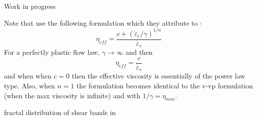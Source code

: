 {Work in progress}

\Literature \cite{zico74,zigo74,zico74b,zien75,corm75,zigo75,zihl75,zijo78,vidm82,vidm84,vede84,zivt85,vimd86}
\cite{wasd97,debo88,debo01,hesd02,bewv11,mumg10,leor89,sccm13,desm93,demu92,debo91,shmv16}
\cite{modm01}\cite{baji02}\cite{slde92}
\cite{modm02}\cite{vavd99}\cite{miam13}

Note that \cite{vidm82,vidm84,vimd86,zivt85} use the following formulation which they attribute to \cite{zijo78}:
\[
\eta_{eff} = \frac{c + (\dot{\varepsilon}_e / \gamma)^{1/n}}{ \dot{\varepsilon}_e }
\] 
For a perfectly plastic flow law, $\gamma \rightarrow \infty$ and then 
\[
\eta_{eff} = \frac{c}{ \dot{\varepsilon}_e }
\] 
and when when $c=0$ then the effective viscosity is essentially of the power law type.
Also, when $n=1$ the formulation becomes identical to the v-vp formulation (when the max viscosity is infinite) and with $1/\gamma=\eta_{min}$.

fractal distribution of shear bands in \cite{pohp94}



